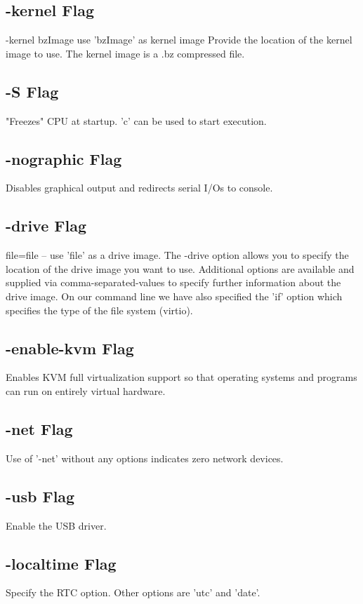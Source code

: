 \documentclass{article}
\begin{document}
\subsection{-kernel Flag}
-kernel bzImage use 'bzImage' as kernel image
Provide the location of the kernel image to use. The kernel image is a .bz compressed file.

\subsection{-S Flag}
"Freezes" CPU at startup. 'c' can be used to start execution.

\subsection{-nographic Flag}
Disables graphical output and redirects serial I/Os to console.  

\subsection{-drive Flag}
file=file -- use 'file' as a drive image.
The -drive option allows you to specify the location of the drive image you want to use. Additional options are available and supplied via comma-separated-values to specify further information about the drive image. On our command line we have also specified the 'if' option which specifies the type of the file system (virtio).

\subsection{-enable-kvm Flag}
Enables KVM full virtualization support so that operating systems and programs can run on entirely virtual hardware.

\subsection{-net Flag}
Use of '-net' without any options indicates zero network devices.

\subsection{-usb Flag}
Enable the USB driver.

\subsection{-localtime Flag}
Specify the RTC option. Other options are 'utc' and 'date'.
\end{document}
